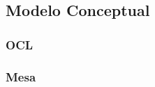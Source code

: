 \subsection{Modelo Conceptual}

\begin{figure}
  \begin{center}
  \end{center}
\end{figure}

\newpage
\subsubsection{OCL}


\subsubsection*{Mesa}

